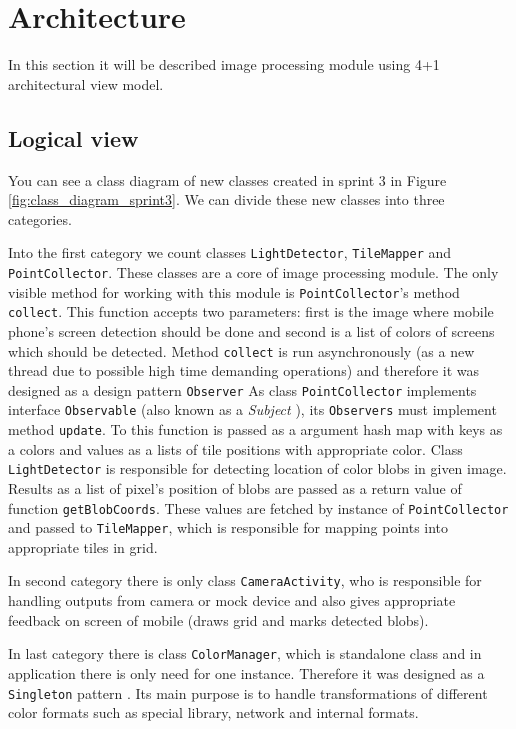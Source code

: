 \section{Architecture}
In this section it will be described image processing module using 4+1 architectural view model.

\subsection{Logical view}
You can see a class diagram of new classes created in sprint 3 in Figure \ref{fig:class_diagram_sprint3}. We can divide these new classes into three categories. 

Into the first category we count classes \texttt{LightDetector}, \texttt{TileMapper} and \texttt{PointCollector}. 
These classes are a core of image processing module. 
The only visible method for working with this module is \texttt{PointCollector}'s method \texttt{collect}.
This function accepts two parameters: first is the image where mobile phone's screen detection should be done and second is a list of colors of screens which should be detected. 
Method \texttt{collect} is run asynchronously (as a new thread due to possible high time demanding operations) and therefore it was designed as a design pattern \texttt{Observer}
As class \texttt{PointCollector} implements interface \texttt{Observable} (also known as a \emph{Subject} \cite[p.~326]{Gamma:1995:DPE:186897}), its \texttt{Observers} must implement method \texttt{update}. 
To this function is passed as a argument hash map with keys as a colors and values as a lists of tile positions with appropriate color.
Class \texttt{LightDetector} is responsible for detecting location of color blobs in given image. 
Results as a list of pixel's position of blobs are passed as a return value of function \texttt{getBlobCoords}. 
These values are fetched by instance of \texttt{PointCollector} and passed to \texttt{TileMapper}, which is responsible for mapping points into appropriate tiles in grid.

In second category there is only class \texttt{CameraActivity}, who is responsible for handling outputs from camera or mock device and also gives appropriate feedback on screen of mobile (draws grid and marks detected blobs).

In last category there is class \texttt{ColorManager}, which is standalone class and in application there is only need for one instance. Therefore it was designed as a \texttt{Singleton} pattern \cite[p.~144]{Gamma:1995:DPE:186897}. Its main purpose is to handle transformations of different color formats such as special library, network and internal formats.

